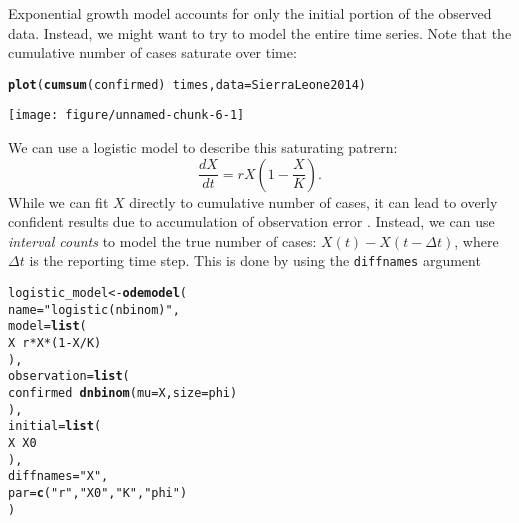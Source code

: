 \documentclass{article}\usepackage[]{graphicx}\usepackage[]{color}
\makeatletter
\def\maxwidth{ %
  \ifdim\Gin@nat@width>\linewidth
    \linewidth
  \else
    \Gin@nat@width
  \fi
}
\newcommand{\hlnum}[1]{\textcolor[rgb]{0.686,0.059,0.569}{#1}}%
\newcommand{\hlstr}[1]{\textcolor[rgb]{0.192,0.494,0.8}{#1}}%
\newcommand{\hlopt}[1]{\textcolor[rgb]{0,0,0}{#1}}%
\newcommand{\hlstd}[1]{\textcolor[rgb]{0.345,0.345,0.345}{#1}}%
\newcommand{\hlkwb}[1]{\textcolor[rgb]{0.69,0.353,0.396}{#1}}%
\newcommand{\hlkwc}[1]{\textcolor[rgb]{0.333,0.667,0.333}{#1}}%
\newcommand{\hlkwd}[1]{\textcolor[rgb]{0.737,0.353,0.396}{\textbf{#1}}}%
\newenvironment{kframe}{%
 \def\at@end@of@kframe{}%
 \ifinner\ifhmode%
  \def\at@end@of@kframe{\end{minipage}}%
  \begin{minipage}{\columnwidth}%
 \fi\fi%
 \def\FrameCommand##1{\hskip\@totalleftmargin \hskip-\fboxsep
 \colorbox{shadecolor}{##1}\hskip-\fboxsep
     \hskip-\linewidth \hskip-\@totalleftmargin \hskip\columnwidth}%
 \MakeFramed {\advance\hsize-\width
   \@totalleftmargin\z@ \linewidth\hsize
   \@setminipage}}%
 {\par\unskip\endMakeFramed%
 \at@end@of@kframe}
\newenvironment{knitrout}{}{} %
\makeatother
\begin{document}
Exponential growth model accounts for only the initial portion of
the observed data. Instead, we might want to try to model the entire
time series. Note that the cumulative number of cases saturate over time:
\begin{knitrout}
\color{fgcolor}\begin{kframe}
\begin{alltt}
\hlkwd{plot}\hlstd{(}\hlkwd{cumsum}\hlstd{(confirmed)} \hlopt{~} \hlstd{times,} \hlkwc{data}\hlstd{=SierraLeone2014)}
\end{alltt}
\end{kframe}
\texttt{[image: figure/unnamed-chunk-6-1]} 

\end{knitrout}
We can use a logistic model to describe this saturating patrern:
\begin{equation}
\frac{dX}{dt} = r X \left(1 - \frac{X}{K}\right).
\end{equation}
While we can fit $X$ directly to cumulative number of cases, it can lead to
overly confident results due to accumulation of observation error \citep{king2015avoidable}.
Instead, we can use \emph{interval counts} to model the true number of cases:
$X(t) - X(t - \Delta t)$, where $\Delta t$ is the reporting time step.
This is done by using the \texttt{diffnames} argument
\begin{knitrout}
\color{fgcolor}\begin{kframe}
\begin{alltt}
\hlstd{logistic_model} \hlkwb{<-} \hlkwd{odemodel}\hlstd{(}
    \hlkwc{name}\hlstd{=}\hlstr{"logistic (nbinom)"}\hlstd{,}
    \hlkwc{model}\hlstd{=}\hlkwd{list}\hlstd{(}
        \hlstd{X} \hlopt{~} \hlstd{r} \hlopt{*} \hlstd{X} \hlopt{*} \hlstd{(}\hlnum{1} \hlopt{-} \hlstd{X}\hlopt{/}\hlstd{K)}
    \hlstd{),}
    \hlkwc{observation}\hlstd{=}\hlkwd{list}\hlstd{(}
        \hlstd{confirmed} \hlopt{~} \hlkwd{dnbinom}\hlstd{(}\hlkwc{mu}\hlstd{=X,} \hlkwc{size}\hlstd{=phi)}
    \hlstd{),}
    \hlkwc{initial}\hlstd{=}\hlkwd{list}\hlstd{(}
        \hlstd{X} \hlopt{~} \hlstd{X0}
    \hlstd{),}
    \hlkwc{diffnames}\hlstd{=}\hlstr{"X"}\hlstd{,}
    \hlkwc{par}\hlstd{=}\hlkwd{c}\hlstd{(}\hlstr{"r"}\hlstd{,} \hlstr{"X0"}\hlstd{,} \hlstr{"K"}\hlstd{,} \hlstr{"phi"}\hlstd{)}
\hlstd{)}
\end{alltt}
\end{kframe}
\end{knitrout}
\end{document}
